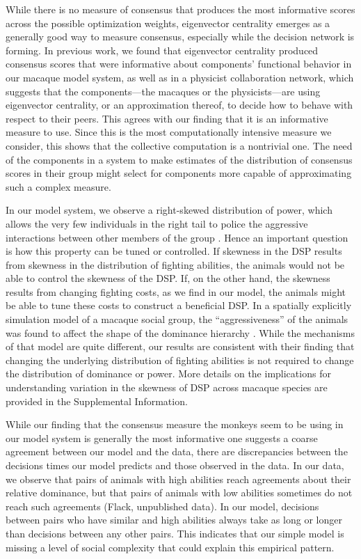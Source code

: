 \documentclass{pnastwo}
\begin{document}
\begin{article}
While there is no measure of consensus that produces the most informative scores across the possible optimization weights, eigenvector centrality emerges as a generally good way to measure consensus, especially while the decision network is forming. In previous work, we found that eigenvector centrality produced consensus scores that were informative about components' functional behavior in our macaque model system, as well as in a physicist collaboration network, which suggests that the components---the macaques or the physicists---are using eigenvector centrality, or an approximation thereof, to decide how to behave with respect to their peers. This agrees with our finding that it is an informative measure to use. Since this is the most computationally intensive measure we consider, this shows that the collective computation is a nontrivial one.  The need of the components in a system to make estimates of the distribution of consensus scores in their group might select for components more capable of approximating such a complex measure.


In our model system, we observe a right-skewed distribution of power, which allows the very few individuals in the right tail to police the aggressive interactions between other members of the group \cite{Brush:2013fk,Flack:2006uq,Flack:2006fk}. Hence an important question is how this property can be tuned or controlled. If skewness in the DSP results from skewness in the distribution of fighting abilities, the animals would not be able to control the skewness of the DSP. If, on the other hand, the skewness results from changing fighting costs, as we find in our model, the animals might be able to tune these costs to construct a beneficial DSP. In a spatially explicitly simulation model of a macaque social group, the ``aggressiveness'' of the animals was found to affect the shape of the dominance hierarchy \cite{Hemelrijk:2011fk}.  While the mechanisms of that model are quite different, our results are consistent with their finding that changing the underlying distribution of fighting abilities is not required to change the distribution of dominance or power. More details on the implications for understanding variation in the skewness  of DSP across macaque species are provided in the Supplemental Information.

While our finding that the consensus measure the monkeys seem to be using in our model system is generally the most informative one suggests a coarse agreement between our model and the data, there are discrepancies between the decisions times our model predicts and those observed in the data.  In our data, we observe that pairs of animals with high abilities reach agreements about their relative dominance, but that pairs of animals with low abilities sometimes do not reach such agreements (Flack, unpublished data).  In our model, decisions between pairs who have similar and high abilities always  take as long or longer than decisions between any other pairs.  This indicates that our simple model is missing a level of social complexity that could explain this empirical pattern.  


\end{article}
\end{document}
